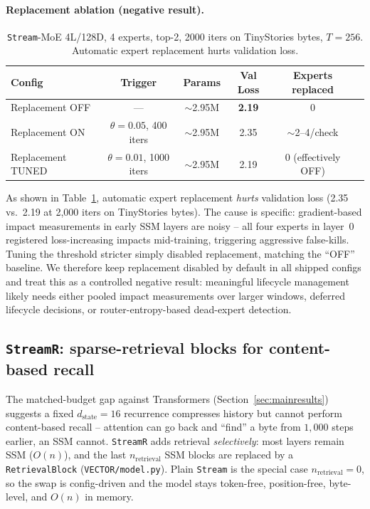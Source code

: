 \documentclass[11pt]{article}
\newcommand{\Stream}{\texttt{Stream}}
\newcommand{\StreamR}{\texttt{StreamR}}
\begin{document}
\paragraph{Replacement ablation (negative result).}
\begin{table}[t]
  \centering
  \small
  \begin{tabular}{lccccc}
    \toprule
    Config & Trigger & Params & Val Loss & Experts replaced \\
    \midrule
    Replacement OFF & --- & $\sim$2.95M & \textbf{2.19} & 0 \\
    Replacement ON & $\theta{=}0.05$, 400 iters & $\sim$2.95M & 2.35 & $\sim$2--4/check \\
    Replacement TUNED & $\theta{=}0.01$, 1000 iters & $\sim$2.95M & 2.19 & 0 (effectively OFF) \\
    \bottomrule
  \end{tabular}
  \caption{\Stream{}-MoE 4L/128D, 4 experts, top-2, 2000 iters on TinyStories
  bytes, $T{=}256$. Automatic expert replacement hurts validation loss.}
  \label{tab:moeab}
\end{table}
As shown in Table~\ref{tab:moeab}, automatic expert replacement \emph{hurts}
validation loss (2.35 vs.\ 2.19 at 2,000 iters on TinyStories bytes). The cause
is specific: gradient-based impact measurements in early SSM layers are noisy --
all four experts in layer~0 registered loss-increasing impacts mid-training,
triggering aggressive false-kills. Tuning the threshold stricter simply
disabled replacement, matching the ``OFF'' baseline. We therefore keep
replacement disabled by default in all shipped configs and treat this as a
controlled negative result: meaningful lifecycle management likely needs either
pooled impact measurements over larger windows, deferred lifecycle decisions,
or router-entropy-based dead-expert detection.

\subsection{\StreamR{}: sparse-retrieval blocks for content-based recall}\label{sec:streamr}
The matched-budget gap against Transformers (Section~\ref{sec:mainresults})
suggests a fixed $d_{\text{state}}{=}16$ recurrence compresses history but
cannot perform content-based recall -- attention can go back and ``find'' a byte
from $1{,}000$ steps earlier, an SSM cannot. \StreamR{} adds retrieval
\emph{selectively}: most layers remain SSM ($O(n)$), and the last
$n_{\text{retrieval}}$ SSM blocks are replaced by a \texttt{RetrievalBlock}
(\texttt{VECTOR/model.py}). Plain \Stream{} is the special case
$n_{\text{retrieval}}{=}0$, so the swap is config-driven and the model stays
token-free, position-free, byte-level, and $O(n)$ in memory.
\end{document}
